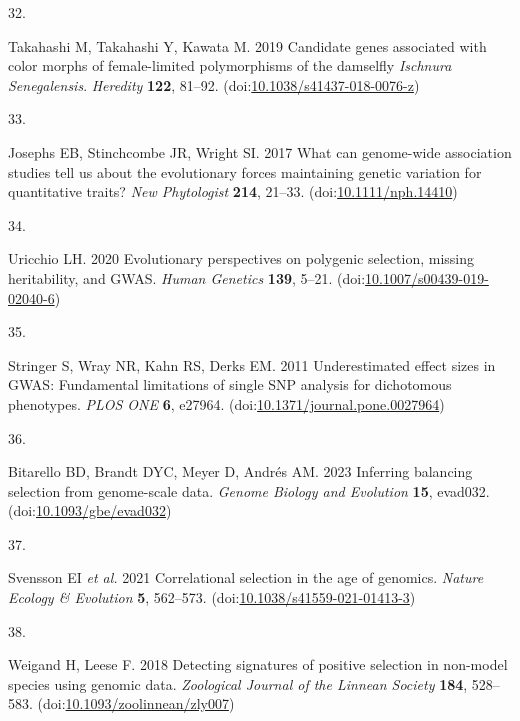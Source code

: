 \documentclass[
  11pt,
  a4paper,
]{article}
\newlength{\cslhangindent}
\newlength{\csllabelwidth}
\newlength{\cslentryspacingunit} %
\newenvironment{CSLReferences}[2] %
 {%
  \setlength{\parindent}{0pt}
  \ifodd #1
  \let\oldpar\par
  \def\par{\hangindent=\cslhangindent\oldpar}
  \fi
  \setlength{\parskip}{#2\cslentryspacingunit}
 }%
 {}
\newcommand{\CSLLeftMargin}[1]{\parbox[t]{\csllabelwidth}{#1}}
\newcommand{\CSLRightInline}[1]{\parbox[t]{\linewidth - \csllabelwidth}{#1}\break}
\begin{document}
\begin{CSLReferences}{0}{0}
\leavevmode{}%
\CSLLeftMargin{32. }%
\CSLRightInline{Takahashi M, Takahashi Y, Kawata M. 2019 Candidate genes associated with color morphs of female-limited polymorphisms of the damselfly {\emph{Ischnura}}{ \emph{Senegalensis}}. \emph{Heredity} \textbf{122}, 81--92. (doi:\href{https://doi.org/10.1038/s41437-018-0076-z}{10.1038/s41437-018-0076-z})}

\leavevmode{}%
\CSLLeftMargin{33. }%
\CSLRightInline{Josephs EB, Stinchcombe JR, Wright SI. 2017 What can genome-wide association studies tell us about the evolutionary forces maintaining genetic variation for quantitative traits? \emph{New Phytologist} \textbf{214}, 21--33. (doi:\href{https://doi.org/10.1111/nph.14410}{10.1111/nph.14410})}

\leavevmode{}%
\CSLLeftMargin{34. }%
\CSLRightInline{Uricchio LH. 2020 Evolutionary perspectives on polygenic selection, missing heritability, and {GWAS}. \emph{Human Genetics} \textbf{139}, 5--21. (doi:\href{https://doi.org/10.1007/s00439-019-02040-6}{10.1007/s00439-019-02040-6})}

\leavevmode{}%
\CSLLeftMargin{35. }%
\CSLRightInline{Stringer S, Wray NR, Kahn RS, Derks EM. 2011 Underestimated effect sizes in {GWAS}: Fundamental limitations of single {SNP} analysis for dichotomous phenotypes. \emph{PLOS ONE} \textbf{6}, e27964. (doi:\href{https://doi.org/10.1371/journal.pone.0027964}{10.1371/journal.pone.0027964})}

\leavevmode{}%
\CSLLeftMargin{36. }%
\CSLRightInline{Bitarello BD, Brandt DYC, Meyer D, Andrés AM. 2023 Inferring balancing selection from genome-scale data. \emph{Genome Biology and Evolution} \textbf{15}, evad032. (doi:\href{https://doi.org/10.1093/gbe/evad032}{10.1093/gbe/evad032})}

\leavevmode{}%
\CSLLeftMargin{37. }%
\CSLRightInline{Svensson EI \emph{et al.} 2021 Correlational selection in the age of genomics. \emph{Nature Ecology \& Evolution} \textbf{5}, 562--573. (doi:\href{https://doi.org/10.1038/s41559-021-01413-3}{10.1038/s41559-021-01413-3})}

\leavevmode{}%
\CSLLeftMargin{38. }%
\CSLRightInline{Weigand H, Leese F. 2018 Detecting signatures of positive selection in non-model species using genomic data. \emph{Zoological Journal of the Linnean Society} \textbf{184}, 528--583. (doi:\href{https://doi.org/10.1093/zoolinnean/zly007}{10.1093/zoolinnean/zly007})}


\end{CSLReferences}
\end{document}
